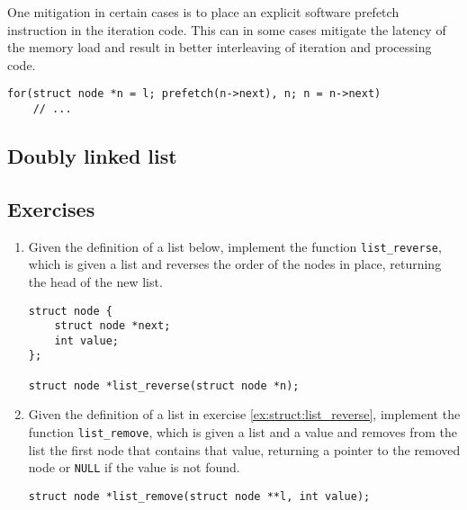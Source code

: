 One mitigation in certain cases is to place an explicit software prefetch
instruction in the iteration code.  This can in some cases mitigate the latency
of the memory load and result in better interleaving of iteration and processing
code\footnotemark.


\begin{lstlisting}
for(struct node *n = l; prefetch(n->next), n; n = n->next)
    // ...
\end{lstlisting}


\subsection{Doubly linked list}


\subsection{Exercises}

\begin{enumerate}
    \item
        \label{ex:struct:list_reverse}
        Given the definition of a list below, implement the function
        \texttt{list\_reverse}, which is given a list and reverses the order of
        the nodes in place, returning the head of the new list.
        \begin{lstlisting}[style=c]
struct node {
    struct node *next;
    int value;
};

struct node *list_reverse(struct node *n);
        \end{lstlisting}
    \item
        \label{ex:struct:list_remove}
        Given the definition of a list in exercise \ref{ex:struct:list_reverse},
        implement the function \texttt{list\_remove}, which is given a list and
        a value and removes from the list the first node that contains that
        value, returning a pointer to the removed node or \texttt{NULL} if the
        value is not found.
        \begin{lstlisting}[style=c]
struct node *list_remove(struct node **l, int value);
        \end{lstlisting}
\end{enumerate}
